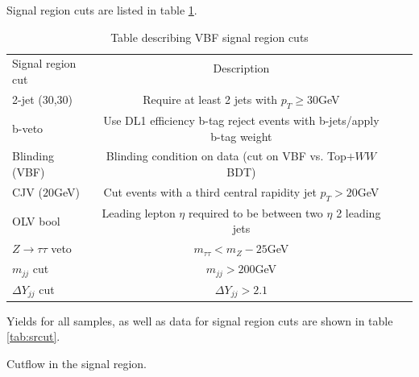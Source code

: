 Signal region cuts are listed in table \ref{tab:SRdef}.  

\begin{table}[h!]
\centering
\small{
\begin{tabular}{|l|c|c|c|}
\hline
\multirow{2}{*}{Signal region cut}   & Description \\
					&	\\
\hline
2-jet (30,30)           & Require at least 2 jets with $p_T \geq 30$GeV\\
b-veto      		& Use DL1 efficiency b-tag reject events with b-jets/apply b-tag weight \\
Blinding (VBF)          & Blinding condition on data (cut on VBF vs. Top$+WW$ BDT) \\
CJV ($20$GeV)		& Cut events with a third central rapidity jet $p_T > 20$GeV \\
OLV bool	        & Leading lepton $\eta$ required to be between two $\eta$ 2 leading jets \\
$Z\rightarrow\tau\tau$ veto & $m_{\tau\tau} < m_Z - 25$GeV \\ 
$m_{jj}$ cut		& $m_{jj} > 200$GeV \\
$\Delta Y_{jj}$ cut	& $\Delta Y_{jj} > 2.1$ \\
\hline
\end{tabular}
\caption{Table describing VBF signal region cuts}
\label{tab:SRdef}
}
\end{table}

Yields for all samples, as well as data for signal region cuts are shown in table \ref{tab:srcut}.
\begin{table}[h!]
\scalebox{0.5}{

}
\caption{Cutflow in the signal region.}
\label{tab:srcut}
\end{table}

